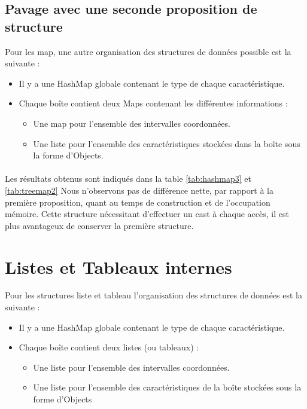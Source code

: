 \subsection{Pavage avec une seconde proposition de structure}
Pour les map, une autre organisation des structures de données possible est la suivante :
\begin{itemize}
\item Il y a une HashMap globale contenant le type de chaque caractéristique.
 \item Chaque boîte contient deux Maps contenant les différentes informations :
\begin{itemize}
 \item Une map pour l'ensemble des intervalles coordonnées.
\item Une liste pour l'ensemble des caractéristiques stockées dans la boîte sous la forme d'Objects.
\end{itemize}
\end{itemize}

\paragraph{}Les résultats obtenus sont indiqués dans la table \ref{tab:hashmap3} et \ref{tab:treemap2}
Nous n'observons pas de différence nette, par rapport à la première proposition, quant au temps de construction et de l'occupation mémoire. Cette structure nécessitant d'effectuer un cast à chaque accès, il est plus avantageux de conserver la première structure.


\section{Listes et Tableaux internes}
Pour les structures liste et tableau l'organisation des structures de données est la suivante :
\begin{itemize}
\item Il y a une HashMap globale contenant le type de chaque caractéristique.
 \item Chaque boîte contient deux listes (ou tableaux) :
\begin{itemize}
 \item Une liste pour l'ensemble des intervalles coordonnées.
\item Une liste pour l'ensemble des caractéristiques de la boîte stockées sous la forme d'Objects
\end{itemize}
\end{itemize}

